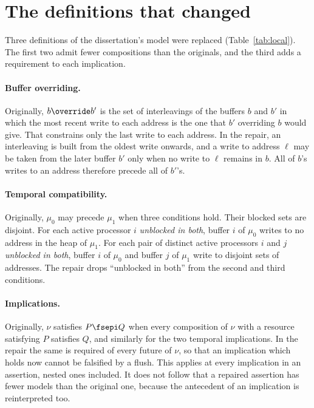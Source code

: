 \section{The definitions that changed}
\label{app:definitions}

Three definitions of the dissertation's model were replaced
(Table~\ref{tab:local}). The first two admit fewer compositions than the originals, and the third
adds a requirement to each implication.

\paragraph{Buffer overriding.}
Originally, $b \override b'$ is the set of interleavings of the buffers $b$
and $b'$ in which the most recent write to each address is the one that
$b'$ overriding $b$ would give. That constrains only the last write to each
address. In the repair, an interleaving is built from the oldest write
onwards, and a write to address $\ell$ may be taken from the later buffer
$b'$ only when no write to $\ell$ remains in $b$. All of $b$'s writes to an address therefore
precede all of $b'$'s.

\paragraph{Temporal compatibility.}
Originally, $\mu_0$ may precede $\mu_1$ when three conditions hold. Their
blocked sets are disjoint. For each active processor $i$ \emph{unblocked
in both}, buffer $i$ of $\mu_0$ writes to no address in the heap of
$\mu_1$. For each pair of distinct active processors $i$ and $j$
\emph{unblocked in both}, buffer $i$ of $\mu_0$ and buffer $j$ of $\mu_1$
write to disjoint sets of addresses. The repair drops ``unblocked in
both'' from the second and third conditions.

\paragraph{Implications.}
Originally, $\nu$ satisfies $P \fsepi Q$ when every composition of $\nu$
with a resource satisfying $P$ satisfies $Q$, and similarly for the two
temporal implications. In the repair the same is required of every future of $\nu$, so that an
implication which holds now cannot be falsified by a flush. This applies
at every implication in an assertion, nested ones included. It does not
follow that a repaired assertion has fewer models than the original one,
because the antecedent of an implication is reinterpreted too.


